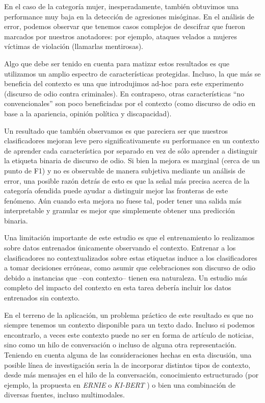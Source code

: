 En el caso de la categoría mujer, inesperadamente, también obtuvimos una performance muy baja en la detección de agresiones misóginas. En el análisis de error, podemos observar que tenemos casos complejos de descifrar que fueron marcados por nuestros anotadores: por ejemplo, ataques velados a mujeres víctimas de violación (llamarlas mentirosas). 

Algo que debe ser tenido en cuenta para matizar estos resultados es que utilizamos un amplio espectro de características protegidas. Incluso, la que más se beneficia del contexto es una que introdujimos ad-hoc para este experimento (discurso de odio contra criminales). En contrapeso, otras características ``no convencionales'' son poco beneficiadas por el contexto (como discurso de odio en base a la apariencia, opinión política y discapacidad).

Un resultado que también observamos es que pareciera ser que nuestros clasificadores mejoran leve pero significativamente su performance en un contexto de aprender cada característica por separado en vez de sólo aprender a distinguir la etiqueta binaria de discurso de odio. Si bien la mejora es marginal (cerca de un punto de F1) y no es observable de manera subjetiva mediante un análisis de error, una posible razón detrás de esto es que la señal más precisa acerca de la categoría ofendida puede ayudar a distinguir mejor las fronteras de este fenómeno. Aún cuando esta mejora no fuese tal, poder tener una salida más interpretable y granular es mejor que simplemente obtener una predicción binaria.

Una limitación importante de este estudio es que el entrenamiento lo realizamos sobre datos entrenados únicamente observando el contexto. Entrenar a los clasificadores no contextualizados sobre estas etiquetas induce a los clasificadores a tomar decisiones erróneas, como asumir que celebraciones son discurso de odio debido a instancias que --con contexto-- tienen esa naturaleza. Un estudio más completo del impacto del contexto en esta tarea debería incluir los datos entrenados sin contexto.

En el terreno de la aplicación, un problema práctico de este resultado es que no siempre tenemos un contexto disponible para un texto dado. Incluso si podemos encontrarlo, a veces este contexto puede no ser en forma de artículo de noticias, sino como un hilo de conversación o incluso de alguna otra representación. Teniendo en cuenta alguna de las consideraciones hechas en esta discusión, una posible línea de investigación seria la de incorporar distintos tipos de contexto, desde más mensajes en el hilo de la conversación, conocimiento estructurado (por ejemplo, la propuesta en \emph{ERNIE} \cite{zhang2019ernie} o \emph{KI-BERT} \cite{faldu2021ki}) o bien una combinación de diversas fuentes, incluso multimodales.

